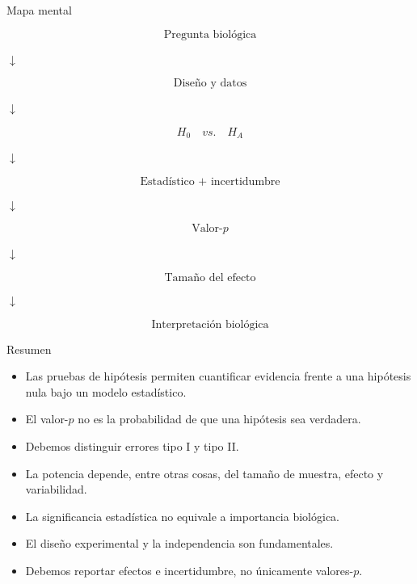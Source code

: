 \begin{frame}{Mapa mental}

\begin{center}
\Large

\[
\boxed{\text{Pregunta biológica}}
\]

$\downarrow$

\[
\boxed{\text{Diseño y datos}}
\]

$\downarrow$

\[
\boxed{H_0\quad vs.\quad H_A}
\]

$\downarrow$

\[
\boxed{\text{Estadístico + incertidumbre}}
\]

$\downarrow$

\[
\boxed{\text{Valor-}p}
\]

$\downarrow$

\[
\boxed{\text{Tamaño del efecto}}
\]

$\downarrow$

\[
\boxed{\text{Interpretación biológica}}
\]

\end{center}

\end{frame}

\begin{frame}{Resumen}

\begin{itemize}
    \item Las pruebas de hipótesis permiten cuantificar evidencia
    frente a una hipótesis nula bajo un modelo estadístico.
    \item El valor-$p$ no es la probabilidad de que una hipótesis sea
    verdadera.
    \item Debemos distinguir errores tipo I y tipo II.
    \item La potencia depende, entre otras cosas, del tamaño de muestra,
    efecto y variabilidad.
    \item La significancia estadística no equivale a importancia biológica.
    \item El diseño experimental y la independencia son fundamentales.
    \item Debemos reportar efectos e incertidumbre, no únicamente
    valores-$p$.
\end{itemize}

\end{frame}

